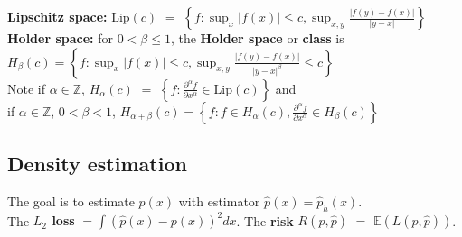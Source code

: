 \documentclass[10pt,twocolumn]{article}
\begin{document}
    \textbf{Lipschitz space:} $\text{Lip}(c)$ $=$ $\left\{ f : \sup_x |f(x)| \leq c, \sup_{x,y} \frac{|f(y)-f(x)|}{|y-x|} \right\}$
\textbf{Holder space:} for $0<\beta\leq 1$, the \textbf{Holder space} or \textbf{class} is\\
    $H_{\beta}(c) = \left\{ f : \sup_x |f(x)| \leq c, 
        \sup_{x,y} \frac{|f(y)-f(x)|}{|y-x|^{\beta}} \leq c \right\}$\\
    Note if $\alpha \in \mathbb{Z}$, $H_{\alpha}(c)$ $=$ $\left\{ f : \frac{\partial^{\alpha} f}{\partial x^{\alpha}} \in \text{Lip}(c) \right\}$ and\\
    if $\alpha \in \mathbb{Z}$, $0 < \beta < 1$, $H_{\alpha+\beta}(c) 
        = \left\{ f : f \in H_{\alpha}(c), \frac{\partial^{\alpha} f}{\partial x^{\alpha}} \in H_{\beta}(c) \right\}$

\subsection*{Density estimation}
    The goal is to estimate $p(x)$ with estimator $\hat{p}(x) = \hat{p}_h(x)$. \\
    The \textbf{$L_2$ loss} $= \int \left( \hat{p}(x) - p(x) \right)^2 dx$.
    The \textbf{risk} $R(p,\hat{p})$ $=$ $\mathbb{E}(L(p,\hat{p}))$.
\end{document}
